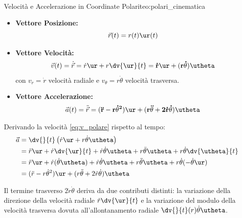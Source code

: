 \begin{teorema}{Velocità e Accelerazione in Coordinate Polari}{teo:polari_cinematica}
\begin{itemize}
    \item \textbf{Vettore Posizione:}
    \begin{equation}
        \vec{r}(t) = r(t)\ur(t)
    \end{equation}
    \item \textbf{Vettore Velocità:}
    \begin{equation}
        \vec{v}(t) = \dot{\vec{r}} = \dot{r}\ur + r\dv{\ur}{t} = \mathbf{\dot{r}\ur + (r\dot{\theta})\utheta}
        \label{eq:v_polare}
    \end{equation}
    con $v_r = \dot{r}$ velocità radiale e $v_\theta = r\dot{\theta}$ velocità trasversa.
    \item \textbf{Vettore Accelerazione:}
    \begin{equation}
        \vec{a}(t) = \ddot{\vec{r}} = \mathbf{(\ddot{r} - r\dot{\theta}^2)\ur + (r\ddot{\theta} + 2\dot{r}\dot{\theta})\utheta}
        \label{eq:a_polare}
    \end{equation}
\end{itemize}
\end{teorema}

\begin{dimostrazione}
Derivando la velocità \eqref{eq:v_polare} rispetto al tempo:
\begin{align*}
    \vec{a} &= \dv{}{t}\left(\dot{r}\ur + r\dot{\theta}\utheta\right) \\
    &= \ddot{r}\ur + \dot{r}\dv{\ur}{t} + \dot{r}\dot{\theta}\utheta + r\ddot{\theta}\utheta + r\dot{\theta}\dv{\utheta}{t} \\
    &= \ddot{r}\ur + \dot{r}(\dot{\theta}\utheta) + \dot{r}\dot{\theta}\utheta + r\ddot{\theta}\utheta + r\dot{\theta}(-\dot{\theta}\ur) \\
    &= (\ddot{r} - r\dot{\theta}^2)\ur + (r\ddot{\theta} + 2\dot{r}\dot{\theta})\utheta
\end{align*}
\end{dimostrazione}

\begin{osservazione}
Il termine trasverso $2\dot{r}\dot{\theta}$ deriva da due contributi distinti: la variazione della direzione della velocità radiale $\dot{r}\dv{\ur}{t}$ e la variazione del modulo della velocità trasversa dovuta all'allontanamento radiale $\dv{}{t}(r)\dot{\theta}\utheta$.
\end{osservazione}

